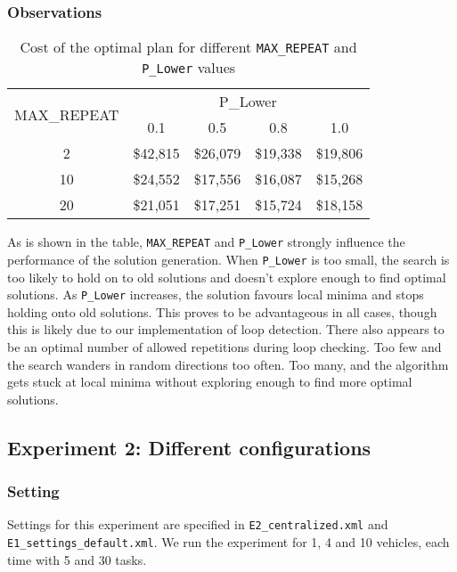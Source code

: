 \documentclass[11pt]{article}
\begin{document}
\subsubsection{Observations}


\begin{table}
	\centering
	\caption{Cost of the optimal plan for different \texttt{MAX\_REPEAT} and \texttt{P\_Lower} values}
	\begin{tabular}{|c|c|c|c|c|}
		\hline
		\multirow{2}{*}{MAX\_REPEAT} & \multicolumn{4}{c|}{P\_Lower} \\ \cline{2-5} 
		& 0.1 & 0.5 & 0.8 & 1.0 \\ \hline
		2 & \$42,815 & \$26,079 & \$19,338 & \$19,806 \\ \hline
		10 & \$24,552 & \$17,556 & \$16,087 & \$15,268 \\ \hline
		20 & \$21,051 & \$17,251 & \$15,724 & \$18,158 \\ \hline
	\end{tabular}
\end{table}


As is shown in the table, \texttt{MAX\_REPEAT} and \texttt{P\_Lower} strongly influence the performance of the solution generation. When \texttt{P\_Lower} is too small, the search is too likely to hold on to old solutions and doesn't explore enough to find optimal solutions. As \texttt{P\_Lower} increases, the solution favours local minima and stops holding onto old solutions. This proves to be advantageous in all cases, though this is likely due to our implementation of loop detection. There also appears to be an optimal number of allowed repetitions during loop checking. Too few and the search wanders in random directions too often. Too many, and the algorithm gets stuck at local minima without exploring enough to find more optimal solutions.

\subsection{Experiment 2: Different configurations}

\subsubsection{Setting}
Settings for this experiment are specified in \texttt{E2\_centralized.xml} and \texttt{E1\_settings\_default.xml}. We run the experiment for 1, 4 and 10 vehicles, each time with 5 and 30 tasks.\\
\end{document}
